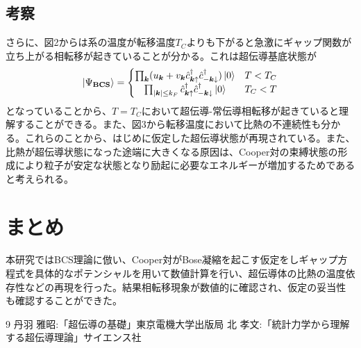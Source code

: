 \documentclass[dvipdfmx, 11pt, twocolumn]{jsarticle}
\begin{document}
\subsection{考察}
    さらに、図2からは系の温度が転移温度$T_C$よりも下がると急激にギャップ関数が立ち上がる相転移が起きていることが分かる。これは超伝導基底状態が
    \begin{align}
        \ket{\Psi_\textbf{BCS}} = 
        \left\{
        \begin{matrix}
            \prod_{\bm{k}}(u_{\bm{k}} + v_{\bm{k}}\hat{c}^\dagger_{\bm{k}\uparrow}\hat{c}^\dagger_{-\bm{k}\downarrow})\ket{0}&T<T_C\\
            \prod_{|\bm{k}|\le k_F}\hat{c}^\dagger_{\bm{k}\uparrow}\hat{c}^\dagger_{-\bm{k}\downarrow} \ket{0}&T_C < T
        \end{matrix}
        \right.
    \end{align}
    となっていることから、$T=T_C$において超伝導-常伝導相転移が起きていると理解することができる。また、図3から転移温度において比熱の不連続性も分かる。これらのことから、はじめに仮定した超伝導状態が再現されている。また、比熱が超伝導状態になった途端に大きくなる原因は、Cooper対の束縛状態の形成により粒子が安定な状態となり励起に必要なエネルギーが増加するためであると考えられる。
\section{まとめ}
    本研究ではBCS理論に倣い、Cooper対がBose凝縮を起こす仮定をしギャップ方程式を具体的なポテンシャルを用いて数値計算を行い、超伝導体の比熱の温度依存性などの再現を行った。結果相転移現象が数値的に確認され、仮定の妥当性も確認することができた。
\begin{thebibliography}{9}
丹羽 雅昭:「超伝導の基礎」東京電機大学出版局
北 孝文:「統計力学から理解する超伝導理論」サイエンス社
\end{thebibliography}
\end{document}
